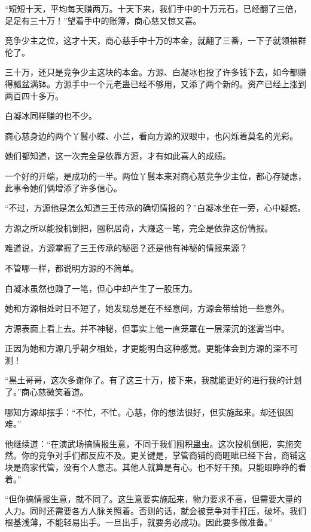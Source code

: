 
\begin{this_body}

“短短十天，平均每天赚两万。十天下来，我们手中的十万元石，已经翻了三倍，足足有三十万！”望着手中的账簿，商心慈又惊又喜。

竞争少主之位，这才十天，商心慈手中十万的本金，就翻了三番，一下子就领袖群伦了。

三十万，还只是竞争少主这块的本金。方源、白凝冰也投了许多钱下去，如今都赚得瓢盆满钵。方源手中一个元老蛊已经不够用，又添了两个新的。资产已经上涨到两百四十多万。

白凝冰同样赚的也不少。

商心慈身边的两个丫鬟小蝶、小兰，看向方源的双眼中，也闪烁着莫名的光彩。

她们都知道，这一次完全是依靠方源，才有如此喜人的成绩。

一个好的开端，是成功的一半。两位丫鬟本来对商心慈竞争少主位，都心存疑虑，此事令她们俩增添了许多信心。

“不过，方源他是怎么知道三王传承的确切情报的？”白凝冰坐在一旁，心中疑惑。

方源之所以能投机倒把，囤积居奇，大赚这一笔，完全是依靠这份情报。

难道说，方源掌握了三王传承的秘密？还是他有神秘的情报来源？

不管哪一样，都说明方源的不简单。

白凝冰虽然也赚了一笔，但心中却产生了一股压力。

她和方源相处时日不短了，她发现总是在不经意间，方源会带给她一些意外。

方源表面上看上去。并不神秘，但事实上他一直笼罩在一层深沉的迷雾当中。

正因为她和方源几乎朝夕相处，才更能明白这种感觉。更能体会到方源的深不可测！

“黑土哥哥，这次多谢你了。有了这三十万，接下来，我就能更好的进行我的计划了。”商心慈微笑着道。

哪知方源却摆手：“不忙，不忙。心慈，你的想法很好，但实施起来。却还很困难。”

他继续道：“在演武场搞情报生意，不同于我们囤积蛊虫。这次投机倒把，实施突然。你的竞争对手们都反应不及。更关键是，掌管商铺的商睚眦已经下台，商铺这块是商家代管，没有个人意志。其他人就算是有心。也不好干预。只能眼睁睁的看着。”

“但你搞情报生意，就不同了。这生意要实施起来，物力要求不高，但需要大量的人力。同时还需要各方人脉关照着。否则的话，就会被竞争对手打压，破坏。我们根基浅薄，不能轻易出手。一旦出手，就要务必成功。因此要多做准备。”


\end{this_body}
